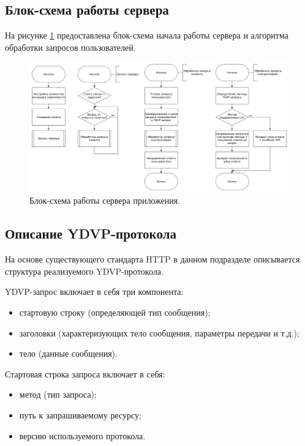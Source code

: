 \subsection{Блок-схема работы сервера}
На рисунке \ref{fig:serverScheme} предоставлена блок-схема начала работы сервера и алгоритма обработки запросов пользователей.

\begin{figure}[hbtp]
	\centering
	\includegraphics[width=\textwidth]{img/serverScheme.png}
	\caption{Блок-схема работы сервера приложения. }
	\label{fig:serverScheme}
\end{figure}

\subsection{Описание YDVP-протокола}
На основе существующего стандарта HTTP в данном подразделе описывается структура реализуемого YDVP-протокола.

YDVP-запрос включает в себя три компонента:
\begin{itemize}[leftmargin=1.6\parindent]
\item стартовую строку (определяющей тип сообщения);
\item заголовки (характеризующих тело сообщения, параметры передачи и т.д.);
\item тело (данные сообщения).
\end{itemize}

Стартовая строка запроса включает в себя:
\begin{itemize}[leftmargin=1.6\parindent]
\item метод (тип запроса);
\item путь к запрашиваемому ресурсу;
\item версию используемого протокола.
\end{itemize}

